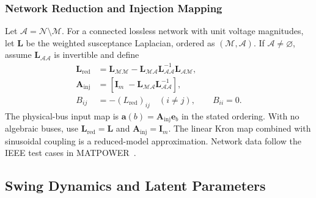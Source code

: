 \documentclass[journal]{IEEEtran}
\begin{document}
\subsubsection{Network Reduction and Injection Mapping}
Let $\mathcal A=\mathcal N\setminus\mathcal M$. For a connected lossless
network with unit voltage magnitudes, let
$\mathbf L$ be the weighted susceptance Laplacian, ordered as
$(\mathcal M,\mathcal A)$. If $\mathcal A\ne\varnothing$, assume
$\mathbf L_{\mathcal A\mathcal A}$ is invertible and define
\begin{align}
\mathbf L_{\mathrm{red}}&=\mathbf L_{\mathcal M\mathcal M}
-\mathbf L_{\mathcal M\mathcal A}\mathbf L_{\mathcal A\mathcal A}^{-1}
\mathbf L_{\mathcal A\mathcal M},\\
\mathbf A_{\mathrm{inj}}&=
\left[\mathbf I_m\; -\mathbf L_{\mathcal M\mathcal A}
\mathbf L_{\mathcal A\mathcal A}^{-1}\right],\\
B_{ij}&=-(L_{\mathrm{red}})_{ij}\quad(i\ne j),\qquad B_{ii}=0.
\label{eq:kron-map}
\end{align}
The physical-bus input map is $\mathbf a(b)=\mathbf A_{\mathrm{inj}}\mathbf e_b$
in the stated ordering. With no algebraic buses, use $\mathbf L_{\mathrm{red}}=\mathbf L$
and $\mathbf A_{\mathrm{inj}}=\mathbf I_m$. The linear Kron map combined with
sinusoidal coupling is a reduced-model approximation. Network data follow
the IEEE test cases in MATPOWER~\cite{zimmerman2011matpower}.


\subsection{Swing Dynamics and Latent Parameters}
\label{sec:dynamics}
\end{document}
